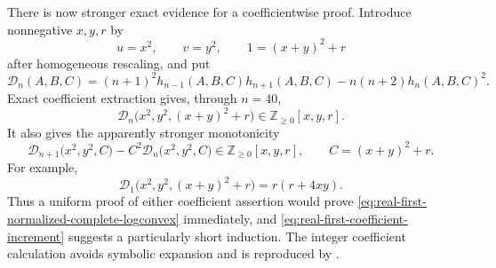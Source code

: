 \documentclass[11pt]{article}
\theoremstyle{remark}
\begin{document}
There is now stronger exact evidence for a coefficientwise proof.  Introduce
nonnegative $x,y,r$ by
\[
 u=x^2,\qquad v=y^2,\qquad 1=(x+y)^2+r
\]
after homogeneous rescaling, and put
\[
 \mathcal D_n(A,B,C)
 =(n+1)^2h_{n-1}(A,B,C)h_{n+1}(A,B,C)
   -n(n+2)h_n(A,B,C)^2.
\]
Exact coefficient extraction gives, through $n=40$,
\begin{equation}\label{eq:real-first-coefficient-cone}
 \mathcal D_n\bigl(x^2,y^2,(x+y)^2+r\bigr)
 \in \mathbb Z_{\geq0}[x,y,r].
\end{equation}
It also gives the apparently stronger monotonicity
\begin{equation}\label{eq:real-first-coefficient-increment}
 \mathcal D_{n+1}\bigl(x^2,y^2,C\bigr)
 -C^2\mathcal D_n\bigl(x^2,y^2,C\bigr)
 \in \mathbb Z_{\geq0}[x,y,r],
 \qquad C=(x+y)^2+r.
\end{equation}
For example,
\[
 \mathcal D_1\bigl(x^2,y^2,(x+y)^2+r\bigr)=r(r+4xy).
\]
Thus a uniform proof of either coefficient assertion would prove
\eqref{eq:real-first-normalized-complete-logconvex} immediately, and
\eqref{eq:real-first-coefficient-increment} suggests a particularly short
induction.  The integer coefficient calculation avoids symbolic expansion and
is reproduced by .
\end{document}

